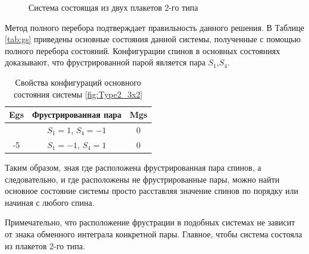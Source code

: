 \documentclass[utf8, babel, sor, jor, amsmath, amssymb, reprint]{elsarticle} %
\begin{document}
\begin{figure}[H]
	\centering
	\begin{minipage}{0.3\textwidth}
		\centering
		\caption{Система состоящая из двух плакетов 2-го типа}
		\label{fig:Type2_3x2}
	\end{minipage}
\end{figure}

Метод полного перебора подтверждает правильность данного решения. В Таблице \eqref{tab:gs} приведены основные состояния данной системы, полученные с помощью полного перебора состояний. Конфигурации спинов в основных состояниях доказывают, что фрустрированной парой является пара $S_1$,$S_4$. 

\begin{table}[H]
	\centering
	\begin{tabular}{|c|c|c|}
		\hline
		 Egs   &   Фрустрированная пара & Mgs\\
		 \hline
		  &  $S_1=1$, $S_4=-1$ & 0 \\
		  \cline{2-3}
		  	-5	\multirow{3}{*}{}
		   &   $S_1=-1$, $S_4=1$ & 0 \\
		\hline
	\end{tabular}
	\caption{Свойства конфигураций основного состояния системы \eqref{fig:Type2_3x2} }
	\label{tab:gs}
\end{table}

Таким образом, зная где расположена фрустрированная пара спинов, а следовательно, и где расположены не фрустрированные пары, можно найти основное состояние системы просто расставляя значение спинов по порядку или начиная с любого спина. 

Примечательно, что расположение фрустрации в подобных системах не зависит от знака обменного интеграла конкретной пары. Главное, чтобы система состояла из плакетов 2-го типа.
\end{document}
